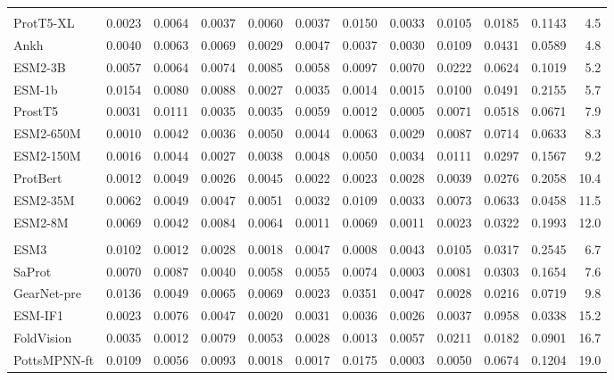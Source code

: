 \begin{longtable}{lrrrrrrrrrrr}
\rowcolor{CompassApricot!35}
\multicolumn{12}{l}{\textit{Measured to read sequence only (10 encoders)}} \\*
ProtT5-XL & 0.0023 & 0.0064 & 0.0037 & 0.0060 & 0.0037 & 0.0150 & 0.0033 & 0.0105 & 0.0185 & 0.1143 & 4.5 \\
Ankh & 0.0040 & 0.0063 & 0.0069 & 0.0029 & 0.0047 & 0.0037 & 0.0030 & 0.0109 & 0.0431 & 0.0589 & 4.8 \\
ESM2-3B & 0.0057 & 0.0064 & 0.0074 & 0.0085 & 0.0058 & 0.0097 & 0.0070 & 0.0222 & 0.0624 & 0.1019 & 5.2 \\
ESM-1b & 0.0154 & 0.0080 & 0.0088 & 0.0027 & 0.0035 & 0.0014 & 0.0015 & 0.0100 & 0.0491 & 0.2155 & 5.7 \\
ProstT5 & 0.0031 & 0.0111 & 0.0035 & 0.0035 & 0.0059 & 0.0012 & 0.0005 & 0.0071 & 0.0518 & 0.0671 & 7.9 \\
ESM2-650M & 0.0010 & 0.0042 & 0.0036 & 0.0050 & 0.0044 & 0.0063 & 0.0029 & 0.0087 & 0.0714 & 0.0633 & 8.3 \\
ESM2-150M & 0.0016 & 0.0044 & 0.0027 & 0.0038 & 0.0048 & 0.0050 & 0.0034 & 0.0111 & 0.0297 & 0.1567 & 9.2 \\
ProtBert & 0.0012 & 0.0049 & 0.0026 & 0.0045 & 0.0022 & 0.0023 & 0.0028 & 0.0039 & 0.0276 & 0.2058 & 10.4 \\
ESM2-35M & 0.0062 & 0.0049 & 0.0047 & 0.0051 & 0.0032 & 0.0109 & 0.0033 & 0.0073 & 0.0633 & 0.0458 & 11.5 \\
ESM2-8M & 0.0069 & 0.0042 & 0.0084 & 0.0064 & 0.0011 & 0.0069 & 0.0011 & 0.0023 & 0.0322 & 0.1993 & 12.0 \\
\rowcolor{CompassApricot!35}
\multicolumn{12}{l}{\textit{Measured to read coordinates (24 encoders)}} \\*
ESM3 & 0.0102 & 0.0012 & 0.0028 & 0.0018 & 0.0047 & 0.0008 & 0.0043 & 0.0105 & 0.0317 & 0.2545 & 6.7 \\
SaProt & 0.0070 & 0.0087 & 0.0040 & 0.0058 & 0.0055 & 0.0074 & 0.0003 & 0.0081 & 0.0303 & 0.1654 & 7.6 \\
GearNet-pre & 0.0136 & 0.0049 & 0.0065 & 0.0069 & 0.0023 & 0.0351 & 0.0047 & 0.0028 & 0.0216 & 0.0719 & 9.8 \\
ESM-IF1 & 0.0023 & 0.0076 & 0.0047 & 0.0020 & 0.0031 & 0.0036 & 0.0026 & 0.0037 & 0.0958 & 0.0338 & 15.2 \\
FoldVision & 0.0035 & 0.0012 & 0.0079 & 0.0053 & 0.0028 & 0.0013 & 0.0057 & 0.0211 & 0.0182 & 0.0901 & 16.7 \\
PottsMPNN-ft & 0.0109 & 0.0056 & 0.0093 & 0.0018 & 0.0017 & 0.0175 & 0.0003 & 0.0050 & 0.0674 & 0.1204 & 19.0 \\

\end{longtable}
